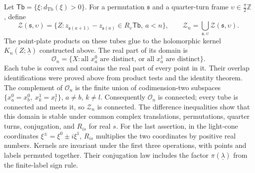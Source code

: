 \documentclass[11pt,letterpaper,reqno]{amsart}
\theoremstyle{definition}
\theoremstyle{remark}
\begin{document}
Let $\mathsf{Tb}=\{\xi:d_{\mathrm{Tb}}(\xi)>0\}$.
For a permutation $\mathfrak s$ and a quarter-turn frame
$\upsilon\in\frac\pi2\mathbb Z$, define
\begin{equation}\label{IV-34-69}
 \mathcal Z(\mathfrak s,\upsilon)
  =\{Z:z_{\mathfrak s(a+1)}-z_{\mathfrak s(a)}
                   \in R_\upsilon\mathsf{Tb},\ a<n\},
 \qquad
 \mathcal Z_n=\bigcup_{\mathfrak s,\upsilon}
                              \mathcal Z(\mathfrak s,\upsilon).
\end{equation}
The point-plate products on these tubes glue to the
holomorphic kernel $K_n(Z;\underline\lambda)$ constructed
above. The real part of its domain is
\[
 \mathcal O_n=\{X:\text{all }x_a^0\text{ are distinct, or all }
                                  x_a^1\text{ are distinct}\}.
\]
Each tube is convex and contains the real part of every
point in it. Their overlap identifications were proved
above from product tests and the identity theorem.
The complement of $\mathcal O_n$ is the finite union
of codimension-two subspaces
$\{x_a^0=x_b^0,\ x_k^1=x_l^1\}$, $a\ne b$, $k\ne l$.
Consequently $\mathcal O_n$ is connected; every tube
is connected and meets it, so $\mathcal Z_n$ is connected.
The difference inequalities show that this domain is
stable under common complex translations, permutations,
quarter turns, conjugation, and $R_{is}$ for real $s$.
For the last assertion, in the light-cone coordinates
$\xi^\pm=\xi^0\pm i\xi^1$, $R_{is}$ multiplies the two
coordinates by positive real numbers. Kernels are
invariant under the first three operations, with
points and labels permuted together. Their conjugation
law includes the factor $\pi(\underline\lambda)$ from
the finite-label sign rule.
\end{document}
